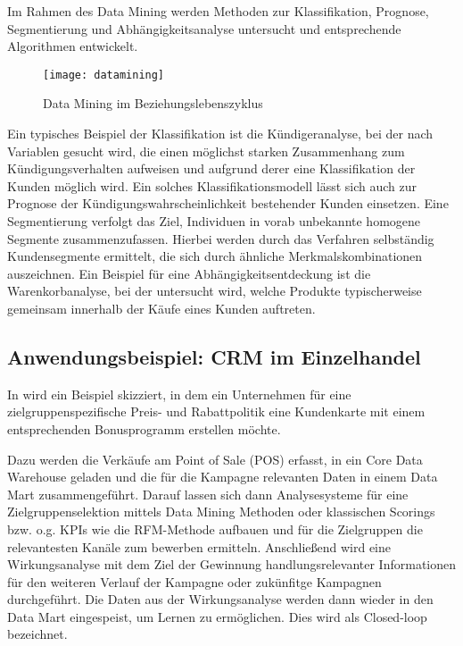 Im Rahmen des Data Mining werden Methoden zur Klassifikation, Prognose, Segmentierung und Abhängigkeitsanalyse untersucht und entsprechende Algorithmen entwickelt.

\begin{figure}[ht]
  \centering
  \texttt{[image: datamining]}
  \caption{Data Mining im Beziehungslebenszyklus\cite[S. 52]{grundcrm}}
  \label{fig:datamining}
\end{figure}

Ein typisches Beispiel der Klassifikation ist die Kündigeranalyse, bei der nach Variablen gesucht wird, die einen möglichst starken Zusammenhang zum Kündigungsverhalten aufweisen und aufgrund derer eine Klassifikation der Kunden möglich wird.
Ein solches Klassifikationsmodell lässt sich auch zur Prognose der Kündigungswahrscheinlichkeit bestehender Kunden einsetzen.
Eine Segmentierung verfolgt das Ziel, Individuen in vorab unbekannte homogene Segmente zusammenzufassen. Hierbei werden durch das Verfahren selbständig Kundensegmente ermittelt, die sich durch ähnliche Merkmalskombinationen auszeichnen.
Ein Beispiel für eine Abhängigkeitsentdeckung ist die Warenkorbanalyse, bei der untersucht wird, welche Produkte typischerweise gemeinsam innerhalb der Käufe eines Kunden auftreten. \cite[S. 51]{grundcrm}

\subsection{Anwendungsbeispiel: CRM im Einzelhandel}

In \cite{biapp} wird ein Beispiel skizziert, in dem ein Unternehmen für eine zielgruppenspezifische Preis- und Rabattpolitik eine Kundenkarte mit einem entsprechenden Bonusprogramm erstellen möchte.

Dazu werden die Verkäufe am Point of Sale (POS) erfasst, in ein Core Data Warehouse geladen und die für die Kampagne relevanten Daten in einem Data Mart zusammengeführt.
Darauf lassen sich dann Analysesysteme für eine Zielgruppenselektion mittels Data Mining Methoden oder klassischen Scorings bzw. o.g. KPIs wie die RFM-Methode \cite{rfmr} aufbauen und für die Zielgruppen die relevantesten Kanäle zum bewerben ermitteln.
Anschließend wird eine Wirkungsanalyse mit dem Ziel der Gewinnung handlungsrelevanter Informationen für den weiteren Verlauf der Kampagne oder zukünfitge Kampagnen durchgeführt. Die Daten aus der Wirkungsanalyse werden dann wieder in den Data Mart eingespeist, um Lernen zu ermöglichen. Dies wird als Closed-loop \cite[S. 223]{biapp} bezeichnet.

